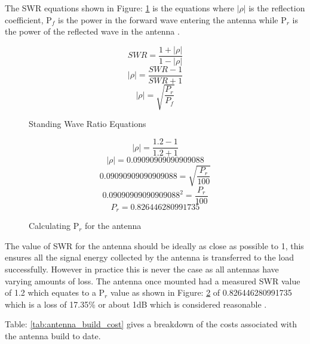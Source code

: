 \documentclass[runningheads,a4paper]{llncs}
\begin{document}
The \gls{SWR} equations shown in Figure: \ref{fig:swr_equation} is the  equations where $|\rho|$ is the reflection coefficient, P$_{f}$ is the power in the forward wave entering the antenna while P$_{r}$ is the power of the reflected wave in the antenna \citep{arrl-00}.

%
\begin{figure}[here]
  \centering
  \begin{equation}
  	SWR = \frac{1 + |\rho|}{1 - |\rho|} 
  \end{equation}
  \begin{equation}
  	|\rho| = \frac{SWR - 1}{SWR + 1} 
  \end{equation}
  \begin{equation}
  	|\rho| = \sqrt{\frac{P_r}{P_f}}
  \end{equation}
  \caption{Standing Wave Ratio Equations}
  \label{fig:swr_equation}
\end{figure}
%

%
\begin{figure}[here]
  \centering
  \begin{equation}
  	|\rho| = \frac{1.2 - 1}{1.2 + 1} 
  \end{equation}
  \begin{equation}
  	|\rho| = 0.09090909090909088
  \end{equation}
  \begin{equation}
  	0.09090909090909088 = \sqrt{\frac{P_r}{100}}
  \end{equation}
  \begin{equation}
  	0.09090909090909088^2 = \frac{P_r}{100}
  \end{equation}
  \begin{equation}
  	P_r = 0.826446280991735
  \end{equation}
  \caption{Calculating P$_{r}$ for the antenna}
  \label{fig:swr_equation_pr}
\end{figure}
%

The value of \gls{SWR} for the antenna should be ideally as close as possible to 1, this ensures all the signal energy collected by the antenna is transferred to the load successfully. However in practice this is never the case as all antennas have varying amounts of loss. The antenna once mounted had a measured \gls{SWR} value of 1.2 which equates to a P$_{r}$ value as shown in Figure: \ref{fig:swr_equation_pr} of 0.826446280991735 which is a loss of 17.35\% or about 1dB which is considered reasonable \citep{arrl-00}.

\newpage
Table: \ref{tab:antenna_build_cost} gives a breakdown of the costs associated with the antenna build to date.
\end{document}
